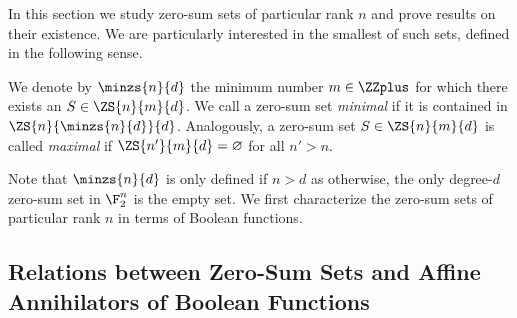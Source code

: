 
In this section we study zero-sum sets of particular rank $n$ and prove results on their existence. We are particularly interested in the smallest of such sets, defined in the following sense.
\begin{definition}
We denote by $\minzs{n}{d}$ the minimum number $m \in \ZZplus$ for which there exists an $S \in \ZS{n}{m}{d}$. We call a zero-sum set \emph{minimal} if it is contained in $\ZS{n}{\minzs{n}{d}}{d}$. Analogously, a zero-sum set $S \in \ZS{n}{m}{d}$ is called \emph{maximal} if $\ZS{n'}{m}{d} = \varnothing$ for all $n' > n$. 
\end{definition}

Note that $\minzs{n}{d}$ is only defined if $n > d$ as otherwise, the only degree-$d$ zero-sum set in $\F_2^n$ is the empty set. We first characterize the zero-sum sets of particular rank $n$ in terms of Boolean functions.


\subsection{Relations between Zero-Sum Sets and Affine Annihilators of Boolean Functions}

